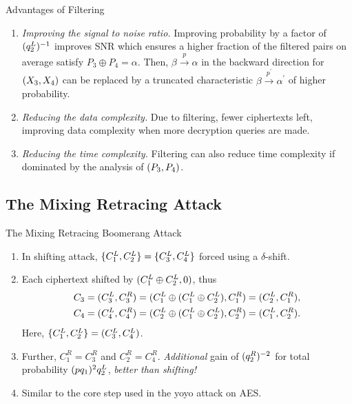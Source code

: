 \documentclass[notheorems]{beamer}
\theoremstyle{definition}
\theoremstyle{example}
\begin{document}
    \begin{frame}[<+->]{Advantages of Filtering}
        \begin{enumerate}
            \item \emph{Improving the signal to noise ratio.} Improving
            probability by a factor of \((q_2^L)^{-1}\) improves SNR which
            ensures a higher fraction of the filtered pairs on average satisfy
            \(P_3 \oplus P_4 = \alpha\). Then, \(\beta \xrightarrow{p} \alpha\)
            in the backward direction for \((X_3, X_4)\) can be replaced by
            a truncated characteristic \(\beta \xrightarrow{p^\prime}
            \alpha^\prime\) of higher probability.
            \item \emph{Reducing the data complexity.} Due to filtering, fewer
            ciphertexts left, improving data complexity when more decryption
            queries are made.
            \item \emph{Reducing the time complexity.} Filtering can also reduce
            time complexity if dominated by the analysis of \((P_3, P_4)\).
        \end{enumerate}
    \end{frame}

    \subsection{The Mixing Retracing Attack}
    \label{subsec:mix-retr-boomerang}

    \begin{frame}[<+->]{The Mixing Retracing Boomerang Attack}
        \begin{enumerate}
            \item In shifting attack, \(\{C_1^L, C_2^L\} = \{C_3^L,
            C_4^L\}\) forced using a \(\delta\)-shift.
            \item Each ciphertext shifted by \((C_1^L \oplus C_2^L, 0)\),
            thus
            \begin{align}
                C_3 &= (C_3^L, C_3^R) = (C_1^L \oplus (C_1^L \oplus C_2^L), C_1^R) = (C_2^L, C_1^R), \\
                C_4 &= (C_4^L, C_4^R) = (C_2^L \oplus (C_1^L \oplus C_2^L), C_2^R) = (C_1^L, C_2^R).
            \end{align}
            Here, \(\{C_1^L, C_2^L\} = (C_3^L, C_4^L)\).
            \item Further, \(C_1^R = C_3^R\) and \(C_2^R = C_4^R\).
            \emph{Additional} gain of \((q_2^R)^{-2}\) for total
            probability \((pq_1)^2q_2^L\), \emph{better than shifting!}
            \item Similar to the core step used in the yoyo attack on AES.
        \end{enumerate}
    \end{frame}
\end{document}

